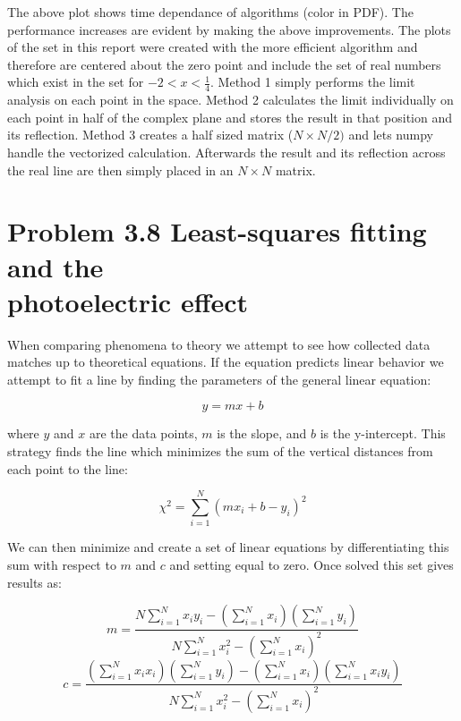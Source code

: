 \documentclass[12pt]{article}
\begin{document}
The above plot shows time dependance of algorithms (color in PDF).  The performance increases are evident by making the above improvements.  The plots of the set in this report were created with the more efficient algorithm and therefore are centered about the zero point and include the set of real numbers which exist in the set for $-2 < x < \frac{1}{4}$.  Method 1 simply performs the limit analysis on each point in the space.  Method 2 calculates the limit individually on each point in half of the complex plane and stores the result in that position and its reflection.  Method 3 creates a half sized matrix ($N \times N/2)$ and lets numpy handle the vectorized calculation.  Afterwards the result and its reflection across the real line are then simply placed in an $N \times N$ matrix.

\section*{Problem 3.8 Least-squares fitting and the \\photoelectric effect}

When comparing phenomena to theory we attempt to see how collected data matches up to theoretical equations.  If the equation predicts linear behavior we attempt to fit a line by finding the parameters of the general linear equation:

\begin{equation}
y = mx + b
\end{equation}

where $y$ and $x$ are the data points, $m$ is the slope, and $b$ is the y-intercept.  This strategy finds the line which minimizes the sum of the vertical distances from each point to the line:

\begin{equation}
\chi^2 = \sum^{N}_{i=1}(mx_i + b - y_i)^2
\end{equation}

We can then minimize and create a set of linear equations by differentiating this sum with respect to $m$ and $c$ and setting equal to zero.  Once solved this set gives results as:

\begin{equation}
m = \frac{N\sum^N_{i=1}x_iy_i - (\sum^N_{i=1}x_i)(\sum^N_{i=1}y_i)}{N\sum^N_{i=1}x_i^2 - (\sum^N_{i=1}x_i)^2}
\end{equation}
\begin{equation}
c = \frac{(\sum^N_{i=1}x_ix_i)(\sum^N_{i=1}y_i) - (\sum^N_{i=1}x_i)(\sum^N_{i=1}x_iy_i)}{N\sum^N_{i=1}x_i^2 - (\sum^N_{i=1}x_i)^2} 
\end{equation}
\end{document}
